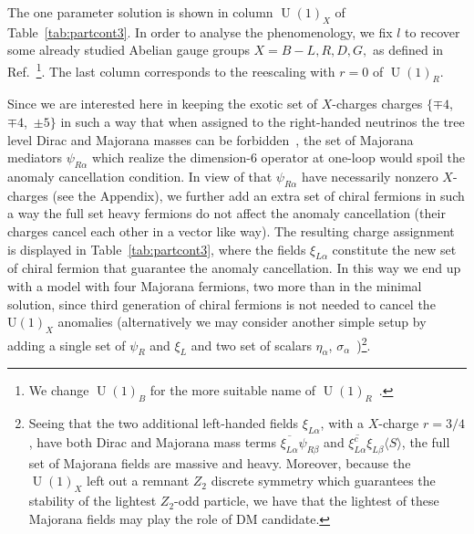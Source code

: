 \documentclass[12pt]{article}
\begin{document}
The one parameter solution is shown in  column $\operatorname{U}(1)_X$
of Table~\ref{tab:partcont3}.
In order to analyse the phenomenology, we fix $l$ to recover some already studied
Abelian gauge groups $X=B-L,R,D,G,$ as defined in Ref.~\cite{Campos:2017dgc}\footnote{We change $\operatorname{U}(1)_B$ for the more suitable name of $\operatorname{U}(1)_R$~\cite{Jana:2019mez}.}. The last column corresponds to the reescaling with $r=0$ of $\operatorname{U}(1)_R$.

Since we are interested here in keeping the exotic set of $X$-charges
charges $\{\mp 4$,~$\mp 4$,~$\pm 5\}$ in such a way that when assigned
to the right-handed neutrinos the tree level Dirac and Majorana masses
can be forbidden~\cite{Calle:2018ovc}, the set of Majorana mediators
$\psi_{R\alpha}$ which realize the dimension-6 operator at one-loop
 would spoil the anomaly cancellation
condition.
In view of that $\psi_{R\alpha}$ have necessarily nonzero $X$-charges (see the Appendix), we further add an extra set of chiral fermions in 
such a way the full set heavy fermions  do not affect
the anomaly cancellation (their charges cancel each other in a vector like way). 
The resulting charge assignment is displayed in
Table~\ref{tab:partcont3}, where 
the fields $\xi_{L \alpha}$ constitute the new set of chiral fermion that guarantee the anomaly cancellation.
In this way we end up with a model with four Majorana fermions, two more than in the minimal solution, since third generation of chiral fermions is not needed to cancel the $\operatorname{U(1)}_X$ anomalies (alternatively we may consider another simple setup by adding a single set of $\psi_R$ and $\xi_L$ and two set of scalars $\eta_\alpha$, $\sigma_{\alpha}$~\cite{Reig:2018mdk})\footnote{
Seeing that the two additional left-handed fields $\xi_{L\alpha}$,  with a $X$-charge $r=3/4$,  have both Dirac and Majorana mass terms $\overline{\xi_{L \alpha}}\psi_{R \beta}$ and $ \overline{\xi_{L\alpha}^c }\xi_{L \beta} \langle S\rangle$, the full set of Majorana fields are massive and heavy. 
Moreover, because the $\operatorname{U}(1)_{X}$ left out a remnant $Z_2$ discrete symmetry which guarantees the stability of the lightest $Z_2$-odd particle,  we have that the lightest of these Majorana fields may play the role of DM candidate.}.



\end{document}
